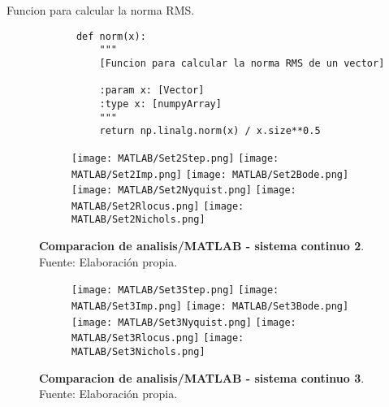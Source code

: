     \begin{longlisting}
        \caption[Funcion para calcular la norma RMS]{Funcion para calcular la norma RMS.}
        \label{code:normarms}				
        \begin{verbatim}
            def norm(x):
                """
                [Funcion para calcular la norma RMS de un vector]
                
                :param x: [Vector]
                :type x: [numpyArray]
                """
                return np.linalg.norm(x) / x.size**0.5
        \end{verbatim}
    \end{longlisting}

        
    \begin{figure}[!h]
        \centering
        \begin{subfigure}[t]{0.99\textwidth}
            \centering
            \texttt{[image: MATLAB/Set2Step.png]}
            \texttt{[image: MATLAB/Set2Imp.png]}
            \texttt{[image: MATLAB/Set2Bode.png]}
            \texttt{[image: MATLAB/Set2Nyquist.png]}
            \texttt{[image: MATLAB/Set2Rlocus.png]}
            \texttt{[image: MATLAB/Set2Nichols.png]}
            \label{fig:Set2sub}
        \end{subfigure}
        \caption[Comparacion de analisis/MATLAB - sistema continuo 2]{\textbf{Comparacion de analisis/MATLAB - sistema continuo 2}. Fuente: Elaboración propia. \label{fig:Set2}}
    \end{figure}

    \begin{figure}[htb]
        \centering
        \begin{subfigure}[t]{0.99\textwidth}
            \centering
            \texttt{[image: MATLAB/Set3Step.png]}
            \texttt{[image: MATLAB/Set3Imp.png]}
            \texttt{[image: MATLAB/Set3Bode.png]}
            \texttt{[image: MATLAB/Set3Nyquist.png]}
            \texttt{[image: MATLAB/Set3Rlocus.png]}
            \texttt{[image: MATLAB/Set3Nichols.png]}
            \label{fig:Set3sub}
        \end{subfigure}
        \caption[Comparacion de analisis/MATLAB - sistema continuo 3]{\textbf{Comparacion de analisis/MATLAB - sistema continuo 3}. Fuente: Elaboración propia. \label{fig:Set3}}
    \end{figure}

